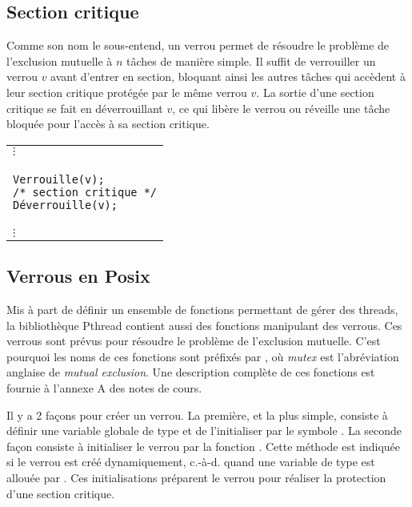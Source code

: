 \subsection{Section critique}
Comme son nom le sous-entend, un verrou permet de résoudre le problème de l'exclusion mutuelle à $n$ tâches de manière simple. Il suffit de verrouiller un verrou $v$ avant d'entrer en section, bloquant ainsi les autres tâches qui accèdent à leur section critique protégée par le même verrou $v$. La sortie d'une section critique se fait en déverrouillant $v$, ce qui libère le verrou ou réveille une tâche bloquée pour l'accès à sa section critique.
\begin{center}
\vspace{-0.2 cm}
\begin{tabular}{l}
\hspace{0.6 cm}$\vdots$ \\
\begin{lstlisting}
Verrouille(v);
/* section critique */
Déverrouille(v);
\end{lstlisting} \\
\hspace{0.6 cm}$\vdots$
\end{tabular}
\end{center}

\subsection{Verrous en Posix}
Mis à part de définir un ensemble de fonctions permettant de gérer des threads, la bibliothèque Pthread contient aussi des fonctions manipulant des verrous.
Ces verrous sont prévus pour résoudre le problème de l'exclusion mutuelle. C'est pourquoi les noms de ces fonctions sont préfixés par , où {\em mutex} est l'abréviation anglaise de {\em mutual exclusion}. Une description complète de ces fonctions est fournie à l'annexe A des notes de cours.

Il y a 2 façons pour créer un verrou. La première, et la plus simple, consiste à définir une variable globale de type  et de l'initialiser par le symbole . La seconde façon consiste à initialiser le verrou par la fonction . Cette méthode est indiquée si le verrou est créé dynamiquement, c.-à-d. quand une variable de type  est allouée par . Ces initialisations préparent le verrou pour réaliser la protection d'une section critique.

